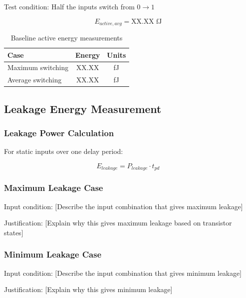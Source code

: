 \documentclass[12pt,letterpaper]{article}
\begin{document}
Test condition: Half the inputs switch from $0 \rightarrow 1$

\begin{equation}
E_{active,avg} = \text{XX.XX fJ}
\end{equation}

\begin{table}[H]
\centering
\caption{Baseline active energy measurements}
\label{tab:baseline_active_energy}
\begin{tabular}{@{}lcc@{}}
\toprule
\textbf{Case} & \textbf{Energy} & \textbf{Units} \\
\midrule
Maximum switching & XX.XX & fJ \\
Average switching & XX.XX & fJ \\
\bottomrule
\end{tabular}
\end{table}

\subsection{Leakage Energy Measurement}

\subsubsection{Leakage Power Calculation}

For static inputs over one delay period:

\begin{equation}
E_{leakage} = P_{leakage} \cdot t_{pd}
\end{equation}

\subsubsection{Maximum Leakage Case}

Input condition: [Describe the input combination that gives maximum leakage]

Justification: [Explain why this gives maximum leakage based on transistor states]

\subsubsection{Minimum Leakage Case}

Input condition: [Describe the input combination that gives minimum leakage]

Justification: [Explain why this gives minimum leakage]
\end{document}
